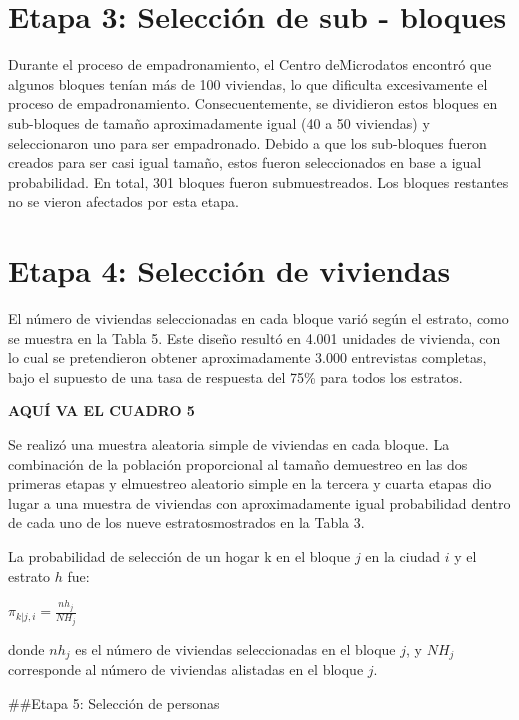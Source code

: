 \documentclass[
]{book}
\begin{document}
\hypertarget{etapa-3-selecciuxf3n-de-sub---bloques}{%
\section{Etapa 3: Selección de sub -
bloques}\label{etapa-3-selecciuxf3n-de-sub---bloques}}

Durante el proceso de empadronamiento, el Centro deMicrodatos encontró
que algunos bloques tenían más de 100 viviendas, lo que dificulta
excesivamente el proceso de empadronamiento. Consecuentemente, se
dividieron estos bloques en sub-bloques de tamaño aproximadamente igual
(40 a 50 viviendas) y seleccionaron uno para ser empadronado. Debido a
que los sub-bloques fueron creados para ser casi igual tamaño, estos
fueron seleccionados en base a igual probabilidad. En total, 301 bloques
fueron submuestreados. Los bloques restantes no se vieron afectados por
esta etapa.

\hypertarget{etapa-4-selecciuxf3n-de-viviendas}{%
\section{Etapa 4: Selección de
viviendas}\label{etapa-4-selecciuxf3n-de-viviendas}}

El número de viviendas seleccionadas en cada bloque varió según el
estrato, como se muestra en la Tabla 5. Este diseño resultó en 4.001
unidades de vivienda, con lo cual se pretendieron obtener
aproximadamente 3.000 entrevistas completas, bajo el supuesto de una
tasa de respuesta del 75\% para todos los estratos.

\textbf{AQUÍ VA EL CUADRO 5}

Se realizó una muestra aleatoria simple de viviendas en cada bloque. La
combinación de la población proporcional al tamaño demuestreo en las dos
primeras etapas y elmuestreo aleatorio simple en la tercera y cuarta
etapas dio lugar a una muestra de viviendas con aproximadamente igual
probabilidad dentro de cada uno de los nueve estratosmostrados en la
Tabla 3.

La probabilidad de selección de un hogar k en el bloque \(j\) en la
ciudad \(i\) y el estrato \(h\) fue:

\(\pi_{k|j,i}=\frac{nh_j}{NH_j}\)

donde \(nh_j\) es el número de viviendas seleccionadas en el bloque
\(j\), y \(NH_j\) corresponde al número de viviendas alistadas en el
bloque \(j\).

\#\#Etapa 5: Selección de personas
\end{document}
